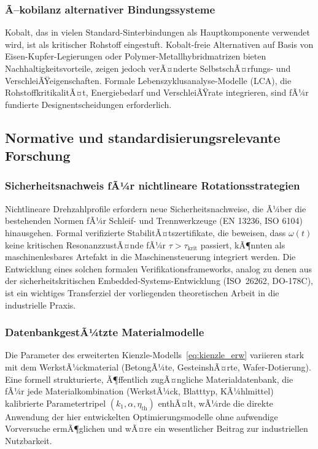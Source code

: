 ﻿\documentclass[a4paper,12pt]{article}
\theoremstyle{definition}
\begin{document}
\subsubsection{Ã–kobilanz alternativer Bindungssysteme}

Kobalt, das in vielen Standard-Sinterbindungen als Hauptkomponente verwendet wird,
ist als kritischer Rohstoff eingestuft. Kobalt-freie Alternativen auf Basis von
Eisen-Kupfer-Legierungen oder Polymer-Metallhybridmatrizen bieten Nachhaltigkeitsvorteile,
zeigen jedoch verÃ¤nderte SelbstschÃ¤rfungs- und VerschleiÃŸeigenschaften. Formale
Lebenszyklusana\-lyse-Modelle (LCA), die RohstoffkritikalitÃ¤t, Energiebedarf und
VerschleiÃŸrate integrieren, sind fÃ¼r fundierte Designentscheidungen erforderlich.

\subsection{Normative und standardisierungsrelevante Forschung}

\subsubsection{Sicherheitsnachweis fÃ¼r nichtlineare Rotationsstrategien}

Nichtlineare Drehzahlprofile erfordern neue Sicherheitsnachweise, die Ã¼ber die
bestehenden Normen fÃ¼r Schleif- und Trennwerkzeuge (EN 13236, ISO 6104) hinausgehen.
Formal verifizierte StabilitÃ¤tszertifikate, die beweisen, dass $\omega(t)$ keine
kritischen ResonanzzustÃ¤nde fÃ¼r $\tau > \tau_{\mathrm{krit}}$ passiert, kÃ¶nnten
als maschinenlesbares Artefakt in die Maschinensteuerung integriert werden.
Die Entwicklung eines solchen formalen Verifikationsframeworks, analog zu denen aus
der sicherheitskritischen Embedded-Systems-Entwicklung (ISO~26262, DO-178C), ist
ein wichtiges Transferziel der vorliegenden theoretischen Arbeit in die industrielle Praxis.

\subsubsection{DatenbankgestÃ¼tzte Materialmodelle}

Die Parameter des erweiterten Kienzle-Modells~\eqref{eq:kienzle_erw} variieren
stark mit dem WerkstÃ¼ckmaterial (BetongÃ¼te, GesteinshÃ¤rte, Wafer-Dotierung).
Eine formell strukturierte, Ã¶ffentlich zugÃ¤ng\-liche Materialdatenbank, die fÃ¼r
jede Materialkombination (WerkstÃ¼ck, Blatttyp, KÃ¼hlmittel) kalibrierte Parametertripel
$(k_1, \alpha, \eta_{\mathrm{th}})$ enthÃ¤lt, wÃ¼rde die direkte Anwendung der hier
entwickelten Optimierungsmodelle ohne aufwendige Vorversuche ermÃ¶glichen und wÃ¤re
ein wesentlicher Beitrag zur industriellen Nutzbarkeit.
\end{document}
